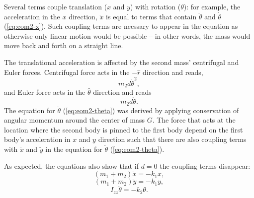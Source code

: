 \documentclass{article}
\begin{document}
Several terms couple translation ($x$ and $y$) with rotation ($\theta$): for example, the acceleration in the $x$ direction, $\ddot{x}$ is equal to terms that contain $\ddot{\theta}$ and $\dot{\theta}$ (\autoref{eq:eom2-x}). Such coupling terms are necssary to appear in the equation as otherwise only linear motion would be possible -- in other words, the mass would move back and forth on a straight line.
\par 
The translational acceleration is affected by the second mass' centrifugal and Euler forces. Centrifugal force acts in the $-\hat{r}$ direction and reads, 
\begin{equation}
    m_2 d \dot{\theta}^2,
\end{equation}
and Euler force acts in the $\hat{\theta}$ direction and reads
\begin{equation}
    m_2 d \ddot{\theta}.
\end{equation}
The equation for $\ddot{\theta}$ (\autoref{eq:eom2-theta}) was derived by applying conservation of angular momentum around the center of mass $G$. The force that acts at the location where the second body is pinned to the first body depend on the first body's acceleration in $x$ and $y$ direction such that there are also coupling terms with $\ddot{x}$ and $\ddot{y}$ in the equation for $\ddot{\theta}$  (\autoref{eq:eom2-theta}).
\par 
As expected, the equations also show that if $d=0$ the coupling terms disappear:
\begin{equation}
    (m_1 + m_2) \ddot{x} = - k_1 x,
\end{equation}
\begin{equation}
   (m_1 + m_2) \ddot{y} = - k_1 y,
\end{equation}
\begin{equation}
    I_{zz}\ddot{\theta} = - k_2 \theta.
\end{equation}
\end{document}
